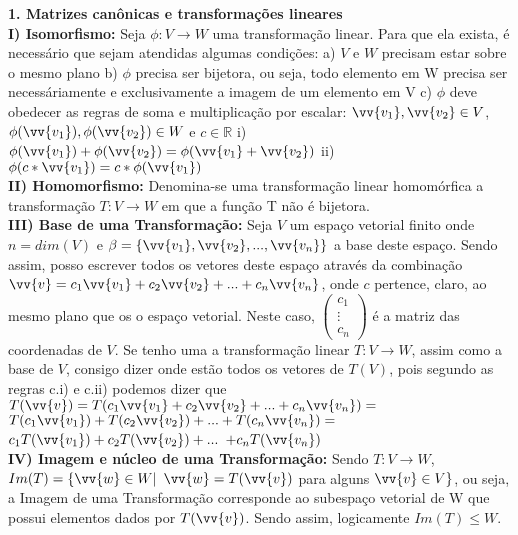 \documentclass[11pt,a4paper]{article}
\newcommand\tab[1][1.835cm]{\hspace*{#1}}
\newcommand\taba[1][2.55cm]{\hspace*{#1}}
\newcommand\tabb[1][2.2cm]{\hspace*{#1}}
\begin{document}
\begin{flushleft}
\textbf{1. Matrizes canônicas e transformações lineares}\linebreak
\\
\tab \textbf{I) Isomorfismo:} Seja $\phi: V \rightarrow W$ uma transformação linear. Para que ela exista, é necessário que sejam atendidas algumas condições: \linebreak
\tabb a) $V$ e $W$ precisam estar sobre o mesmo plano \linebreak
\tabb b) $\phi$ precisa ser bijetora, ou seja, todo elemento em W precisa ser necessáriamente e exclusivamente a imagem de um elemento em V\linebreak
\tabb c) $\phi$ deve obedecer as regras de soma e multiplicação por escalar: \linebreak
\taba $\vv{v_1}, \vv{v_2} \in V$, $\phi(\vv{v_1}), \phi(\vv{v_2}) \in W$ e $c \in \mathbb{R} $ \linebreak
\taba i) $\phi(\vv{v_1}) + \phi(\vv{v_2}) = \phi(\vv{v_1} + \vv{v_2}) $ \linebreak
\taba ii) $\phi(c*\vv{v_1}) = c*\phi(\vv{v_1}) $ \linebreak
\\
\tab \textbf{II) Homomorfismo:} Denomina-se uma transformação linear homomórfica a transformação  $T: V \rightarrow W$ em que a função T não é bijetora. \linebreak
\\
\tab \textbf{III) Base de uma Transformação:} Seja $V$ um espaço vetorial finito onde $ n = dim(V)$ e $\beta = \{ \vv{v_1}, \vv{v_2}, ..., \vv{v_n} \}$ a base deste espaço. Sendo assim, posso escrever todos os vetores deste espaço através da combinação $\vv{v} = c_1\vv{v_1} + c_2\vv{v_2} + ... + c_n\vv{v_n}$, onde $c$ pertence, claro, ao mesmo plano que os o espaço vetorial. Neste caso, $\begin{pmatrix} c_1 \\ \vdots \\ c_n \end{pmatrix}$ é a matriz das coordenadas de $V$.\linebreak
\tabb Se tenho uma a transformação linear $T: V \rightarrow W$, assim como a base de $V$, consigo dizer onde estão todos os vetores de $T(V)$, pois segundo as regras c.i) e c.ii) podemos dizer que $T(\vv{v})=T(c_1\vv{v_1}+c_2\vv{v_2}+...+c_n\vv{v_n})=$ $T(c_1\vv{v_1})+T(c_2\vv{v_2})+...+T(c_n\vv{v_n})= $ $c_1T(\vv{v_1})+c_2T(\vv{v_2})+...$ $ + c_nT(\vv{v_n})$ \linebreak
\\
\tab \textbf{IV) Imagem e núcleo de uma Transformação:} Sendo $T: V \rightarrow W$, $Im(T) = \{ \vv{w} \in W | $ $ \vv{w} = T(\vv{v})$ para alguns $\vv{v} \in V\}$, ou seja, a Imagem de uma Transformação corresponde ao subespaço vetorial de W que possui elementos dados por $T(\vv{v})$. Sendo assim, logicamente $Im(T) \leq W$. \linebreak

\end{flushleft}
\end{document}
